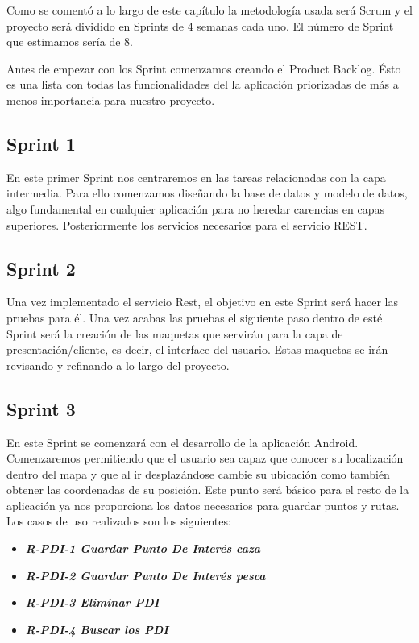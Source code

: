 Como se comentó a lo largo de este capítulo la metodología usada será  Scrum y el proyecto será dividido en Sprints de 4 semanas cada uno. El número de Sprint que estimamos sería de 8.




 Antes de empezar con los Sprint comenzamos creando el Product Backlog. Ésto es una lista con todas las funcionalidades del la aplicación priorizadas de más a menos importancia para nuestro proyecto. 

\subsection{Sprint 1}

En este primer Sprint nos centraremos en las tareas relacionadas con la capa intermedia. Para ello comenzamos diseñando la base de datos y modelo de datos, algo fundamental en cualquier aplicación para no heredar carencias en capas superiores. Posteriormente los servicios necesarios para el servicio REST.


\subsection{Sprint 2}
 Una vez implementado el servicio Rest, el objetivo en este Sprint será hacer las pruebas para él.
 Una vez acabas las pruebas el siguiente paso dentro de esté Sprint será la creación de las maquetas que servirán para la capa de presentación/cliente, es decir, el interface del usuario. Estas maquetas se irán revisando y refinando a lo largo del proyecto.
 
\subsection{Sprint 3}

En este Sprint se comenzará con el desarrollo de la aplicación Android. Comenzaremos permitiendo que el usuario sea capaz que conocer su localización dentro del mapa y que al ir desplazándose cambie su ubicación como también obtener las coordenadas de su posición. Este punto será básico para el resto de la aplicación ya nos proporciona los datos necesarios para guardar puntos y rutas. Los casos de uso realizados son los siguientes:

\begin{itemize}

\item\textbf{\textit{ R-PDI-1 Guardar Punto De Interés caza}}
\item\textit{ \textbf{R-PDI-2 Guardar Punto De Interés pesca}}
\item \textbf{\textit{R-PDI-3 Eliminar PDI}}
\item \textbf{\textit{R-PDI-4 Buscar los PDI}}
\end{itemize} 



